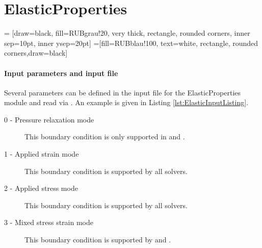 \section{ElasticProperties}
\label{sec:module_elasticproperties}

 = [draw=black, fill=RUBgrau!20, very thick, rectangle, rounded corners, inner sep=10pt, inner ysep=20pt]
 =[fill=RUBblau!100, text=white, rectangle, rounded corners,draw=black]


\paragraph{Input parameters and input file}
Several parameters can be defined in the input file for the ElasticProperties module and read via . An example is given in Listing \ref{lst:ElasticInputListing}. 
\begin{description}
 \item[0 - Pressure relaxation mode] This boundary condition is only supported in  and .
 \item[1 - Applied strain mode] This boundary condition is supported by all solvers.
 \item[2 - Applied stress mode] This boundary condition is supported by all solvers.
 \item[3 - Mixed stress strain mode] This boundary condition is supported by  and .
\end{description}


